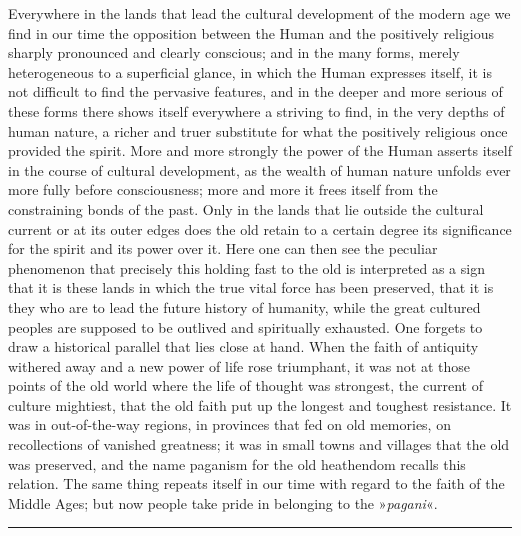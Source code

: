 \documentclass[12pt,a4paper,openany]{book}
\newcommand{\opage}[1]{\marginnote{\footnotesize\textit{[#1]}}}
\begin{document}
Everywhere in the lands that lead the cultural development
of the modern age we find in our time the opposition between
the Human and the positively religious sharply pronounced and
clearly conscious; and in the many forms, merely heterogeneous
to a superficial glance, in which the Human expresses itself,
it is not difficult to find the pervasive features, and in the
deeper and more serious of these forms there shows itself everywhere a
striving to find, in the very depths of human nature, a
richer and truer substitute for what the positively religious
once provided the spirit. More and more strongly the power of the
Human asserts itself in the course of cultural development, as the wealth
of human nature unfolds ever more fully before
consciousness; more and more it frees itself from the constraining
bonds of the past. Only in the lands that lie outside
the cultural current or at its outer edges does the
old retain to a certain degree its significance for the spirit and its
power over it. Here one can then see the peculiar
phenomenon that precisely this holding fast to the old is interpreted
as a sign that it is these lands in which the
true vital force has been preserved, that it is they who are to
lead the future history of humanity, while
the great cultured peoples are supposed to be outlived and spiritually exhausted.
\opage{294}One forgets to draw a historical parallel that lies close at hand.
When the faith of antiquity withered away and a new power of life rose
triumphant, it was not at those points of the old
world where the life of thought was strongest, the current of culture
mightiest, that the old faith put up the longest and toughest resistance.
It was in out-of-the-way regions, in provinces that fed
on old memories, on recollections of vanished greatness;
it was in small towns and villages that the old was preserved,
and the name paganism for the old heathendom
recalls this relation. The same thing repeats itself in our time
with regard to the faith of the Middle Ages; but now people take
pride in belonging to the »\textit{pagani}«.

\begin{center}\rule{1.8cm}{0.4pt}\end{center}
\end{document}
